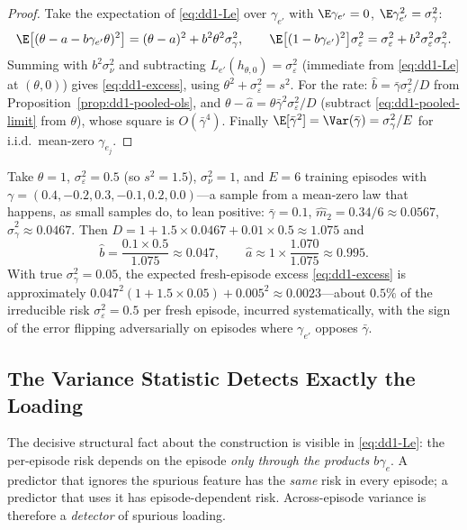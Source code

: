 \begin{proof}
Take the expectation of \eqref{eq:dd1-Le} over $\gamma_{e'}$ with
$\E\gamma_{e'} = 0$, $\E\gamma_{e'}^2 = \sigma_\gamma^2$:
\[
\E\bigl[(\theta - a - b\gamma_{e'}\theta)^2\bigr]
= (\theta - a)^2 + b^2\theta^2\sigma_\gamma^2,
\qquad
\E\bigl[(1 - b\gamma_{e'})^2\bigr]\sigma_\varepsilon^2
= \sigma_\varepsilon^2 + b^2 \sigma_\varepsilon^2 \sigma_\gamma^2 .
\]
Summing with $b^2\sigma_\nu^2$ and subtracting
$L_{e'}(h_{\theta,0}) = \sigma_\varepsilon^2$ (immediate from
\eqref{eq:dd1-Le} at $(\theta, 0)$) gives \eqref{eq:dd1-excess}, using
$\theta^2 + \sigma_\varepsilon^2 = s^2$. For the rate: $\widehat b =
\bar\gamma \sigma_\varepsilon^2 / D$ from
Proposition~\ref{prop:dd1-pooled-ols}, and $\theta - \widehat a =
\theta \bar\gamma^2 \sigma_\varepsilon^2 / D$ (subtract
\eqref{eq:dd1-pooled-limit} from $\theta$), whose square is $O(\bar\gamma^4)$.
Finally $\E[\bar\gamma^2] = \Var(\bar\gamma) = \sigma_\gamma^2 / E$ for
i.i.d.\ mean-zero $\gamma_{e_j}$.
\end{proof}

\begin{example}
\label{ex:dd1-pooled-numbers}
Take $\theta = 1$, $\sigma_\varepsilon^2 = 0.5$ (so $s^2 = 1.5$),
$\sigma_\nu^2 = 1$, and $E = 6$ training episodes with
$\gamma = (0.4, -0.2, 0.3, -0.1, 0.2, 0.0)$---a sample from a mean-zero law
that happens, as small samples do, to lean positive: $\bar\gamma = 0.1$,
$\widehat{m}_2 = 0.34/6 \approx 0.0567$, $\widehat\sigma_\gamma^2 \approx
0.0467$. Then $D = 1 + 1.5 \times 0.0467 + 0.01 \times 0.5 \approx 1.075$ and
\[
\widehat{b} = \frac{0.1 \times 0.5}{1.075} \approx 0.047, \qquad
\widehat{a} \approx 1 \times \frac{1.070}{1.075} \approx 0.995 .
\]
With true $\sigma_\gamma^2 = 0.05$, the expected fresh-episode excess
\eqref{eq:dd1-excess} is approximately $0.047^2 (1 + 1.5 \times 0.05) +
0.005^2 \approx 0.0023$---about $0.5\%$ of the irreducible risk
$\sigma_\varepsilon^2 = 0.5$ per fresh episode, incurred systematically, with
the sign of the error flipping adversarially on episodes where
$\gamma_{e'}$ opposes $\bar\gamma$.
\end{example}

\subsection{The Variance Statistic Detects Exactly the Loading}

The decisive structural fact about the construction is visible in
\eqref{eq:dd1-Le}: the per-episode risk depends on the episode \emph{only
through the products $b\gamma_e$}. A predictor that ignores the spurious
feature has the \emph{same} risk in every episode; a predictor that uses it
has episode-dependent risk. Across-episode variance is therefore a
\emph{detector} of spurious loading.

